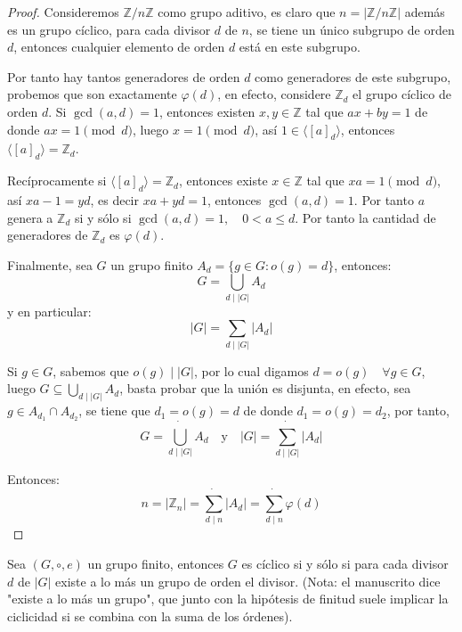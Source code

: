 \begin{proof}
	Consideremos $\mathbb{Z}/n\mathbb{Z}$ como grupo aditivo, es claro que $n = |\mathbb{Z}/n\mathbb{Z}|$ además es un grupo cíclico, para cada divisor $d$ de $n$, se tiene un único subgrupo de orden $d$, entonces cualquier elemento de orden $d$ está en este subgrupo.

	Por tanto hay tantos generadores de orden $d$ como generadores de este subgrupo, probemos que son exactamente $\varphi(d)$, en efecto, considere $\mathbb{Z}_d$ el grupo cíclico de orden $d$. Si $\gcd(a, d) = 1$, entonces existen $x, y \in \mathbb{Z}$ tal que $ax+by=1$ de donde $ax=1 \pmod d$, luego $x=1 \pmod d$, así $1 \in \langle [a]_d \rangle$, entonces $\langle [a]_d \rangle = \mathbb{Z}_d$.

	Recíprocamente si $\langle [a]_d \rangle = \mathbb{Z}_d$, entonces existe $x \in \mathbb{Z}$ tal que $xa = 1 \pmod d$, así $xa-1 = yd$, es decir $xa+yd=1$, entonces $\gcd(a, d) = 1$. Por tanto $a$ genera a $\mathbb{Z}_d$ si y sólo si $\gcd(a, d) = 1, \quad 0 < a \le d$.
	Por tanto la cantidad de generadores de $\mathbb{Z}_d$ es $\varphi(d)$.

	Finalmente, sea $G$ un grupo finito $A_d = \{ g \in G : o(g) = d \}$, entonces:
	\begin{equation*}
		G = \bigcup_{d \mid |G|} A_d
	\end{equation*}
	y en particular:
	\begin{equation*}
		|G| = \sum_{d \mid |G|} |A_d|
	\end{equation*}


	Si $g \in G$, sabemos que $o(g) \mid |G|$, por lo cual digamos $d = o(g) \quad \forall g \in G$, luego $G \subseteq \bigcup_{d \mid |G|} A_d$, basta probar que la unión es disjunta, en efecto, sea $g \in A_{d_1} \cap A_{d_2}$, se tiene que $d_1 = o(g) = d$ de donde $d_1 = o(g) = d_2$, por tanto,
	\begin{equation*}
		G = \dot{\bigcup_{d \mid |G|}} A_d \quad \text{y} \quad |G| = \dot{\sum_{d \mid |G|}} |A_d|
	\end{equation*}


	Entonces:
	\begin{equation*}
		n = |\mathbb{Z}_n| = \dot{\sum_{d \mid n}} |A_d| = \dot{\sum_{d \mid n}} \varphi(d)
	\end{equation*}

\end{proof}

\begin{prop}
	Sea $(G, \circ, e)$ un grupo finito, entonces $G$ es cíclico si y sólo si para cada divisor $d$ de $|G|$ existe a lo más un grupo de orden el divisor. (Nota: el manuscrito dice "existe a lo más un grupo", que junto con la hipótesis de finitud suele implicar la ciclicidad si se combina con la suma de los órdenes).
\end{prop}

